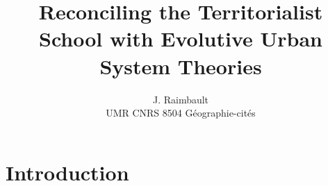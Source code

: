 \documentclass{article}
\begin{document}
\title{Reconciling the Territorialist School with Evolutive Urban System Theories}
\date{}

\author{J. Raimbault\\
UMR CNRS 8504 G{\'e}ographie-cit{\'e}s
}

\maketitle





\section{Introduction}
\end{document}
